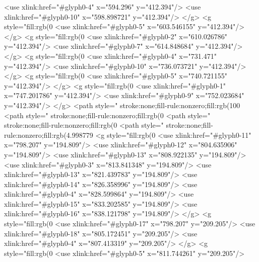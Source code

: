   <use xlink:href="#glyph0-4" x="594.296" y="412.394"/>
  <use xlink:href="#glyph0-10" x="598.898721" y="412.394"/>
</g>
<g style="fill:rgb(0%
  <use xlink:href="#glyph0-5" x="603.546155" y="412.394"/>
</g>
<g style="fill:rgb(0%
  <use xlink:href="#glyph0-2" x="610.026786" y="412.394"/>
  <use xlink:href="#glyph0-7" x="614.848684" y="412.394"/>
</g>
<g style="fill:rgb(0%
  <use xlink:href="#glyph0-4" x="731.471" y="412.394"/>
  <use xlink:href="#glyph0-10" x="736.073721" y="412.394"/>
</g>
<g style="fill:rgb(0%
  <use xlink:href="#glyph0-5" x="740.721155" y="412.394"/>
</g>
<g style="fill:rgb(0%
  <use xlink:href="#glyph0-1" x="747.201786" y="412.394"/>
  <use xlink:href="#glyph0-9" x="752.023684" y="412.394"/>
</g>
<path style=" stroke:none;fill-rule:nonzero;fill:rgb(100%
<path style=" stroke:none;fill-rule:nonzero;fill:rgb(0%
<path style=" stroke:none;fill-rule:nonzero;fill:rgb(0%
<path style=" stroke:none;fill-rule:nonzero;fill:rgb(4.998779%
<g style="fill:rgb(0%
  <use xlink:href="#glyph0-11" x="798.207" y="194.809"/>
  <use xlink:href="#glyph0-12" x="804.635906" y="194.809"/>
  <use xlink:href="#glyph0-13" x="808.922135" y="194.809"/>
  <use xlink:href="#glyph0-3" x="813.841348" y="194.809"/>
  <use xlink:href="#glyph0-13" x="821.439783" y="194.809"/>
  <use xlink:href="#glyph0-14" x="826.358996" y="194.809"/>
  <use xlink:href="#glyph0-4" x="828.599864" y="194.809"/>
  <use xlink:href="#glyph0-15" x="833.202585" y="194.809"/>
  <use xlink:href="#glyph0-16" x="838.121798" y="194.809"/>
</g>
<g style="fill:rgb(0%
  <use xlink:href="#glyph0-17" x="798.207" y="209.205"/>
  <use xlink:href="#glyph0-18" x="805.172451" y="209.205"/>
  <use xlink:href="#glyph0-4" x="807.413319" y="209.205"/>
</g>
<g style="fill:rgb(0%
  <use xlink:href="#glyph0-5" x="811.744261" y="209.205"/>
